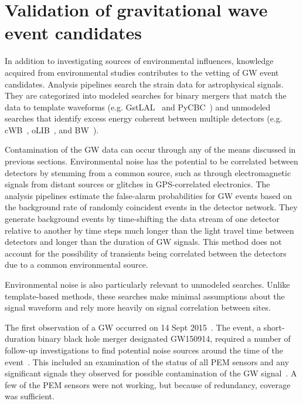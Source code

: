 \section{Validation of gravitational wave event candidates}\label{sec:vetting}

In addition to investigating sources of environmental influences, knowledge acquired from environmental studies contributes to the vetting of \ac{GW} event candidates.
Analysis pipelines search the strain data for astrophysical signals.
They are categorized into modeled searches for binary mergers that match the data to template waveforms (e.g. GstLAL~\citep{Cannon_2012} and PyCBC~\citep{Usman_2016}) and unmodeled searches that identify excess energy coherent between multiple detectors (e.g. cWB~\citep{Klimenko_2008}, oLIB~\citep{Lynch_2017}, and BW~\citep{Cornish_2015}).

Contamination of the \ac{GW} data can occur through any of the means discussed in previous sections.
Environmental noise has the potential to be correlated between detectors by stemming from a common source, such as through electromagnetic signals from distant sources or glitches in GPS-correlated electronics.
The analysis pipelines estimate the false-alarm probabilities for \ac{GW} events based on the background rate of randomly coincident events in the detector network.
They generate background events by time-shifting the data stream of one detector relative to another by time steps much longer than the light travel time between detectors and longer than the duration of \ac{GW} signals.%
This method does not account for the possibility of transients being correlated between the detectors due to a common environmental source.

Environmental noise is also particularly relevant to unmodeled searches. Unlike template-based methods, these searches make minimal assumptions about the signal waveform and rely more heavily on signal correlation between sites.

The first observation of a \ac{GW} occurred on 14 Sept 2015~\citep{gw150914}.
The event, a short-duration binary black hole merger designated GW150914, required a number of follow-up investigations to find potential noise sources around the time of the event~\citep{Detchar_2016}.
This included an examination of the status of all \ac{PEM} sensors and any significant signals they observed for possible contamination of the GW signal~\citep{Schofield_150914}.
A few of the \ac{PEM} sensors were not working, but because of redundancy, coverage was sufficient.

